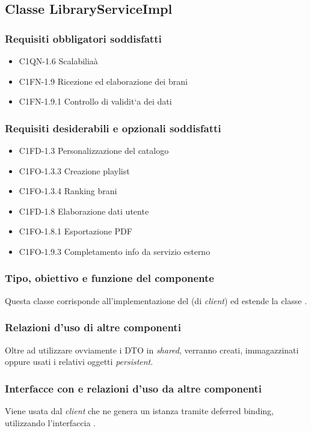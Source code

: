 \subsection{Classe LibraryServiceImpl}
\subsubsection*{Requisiti obbligatori soddisfatti}
\begin{itemize}
    \item C1QN-1.6 Scalabilia\`a
    \item C1FN-1.9 Ricezione ed elaborazione dei brani
    \item C1FN-1.9.1 Controllo di validit`a dei dati
\end{itemize}
\subsubsection*{Requisiti desiderabili e opzionali soddisfatti}
\begin{itemize}
    \item C1FD-1.3 Personalizzazione del catalogo
    \item C1FO-1.3.3 Creazione playlist
    \item C1FO-1.3.4 Ranking brani
    \item C1FD-1.8 Elaborazione dati utente
    \item C1FO-1.8.1 Esportazione PDF
    \item C1FO-1.9.3 Completamento info da servizio esterno
\end{itemize}
\subsubsection*{Tipo, obiettivo e funzione del componente}
Questa classe corrisponde all'implementazione del  (di
\emph{client}) ed estende la classe .
\subsubsection*{Relazioni d'uso di altre componenti}
Oltre ad utilizzare ovviamente i DTO in \emph{shared}, verranno creati,
immagazzinati oppure usati i relativi oggetti \emph{persistent}.
\subsubsection*{Interfacce con e relazioni d'uso da altre componenti}
Viene usata dal \emph{client} che ne genera un istanza tramite deferred binding,
utilizzando l'interfaccia .
